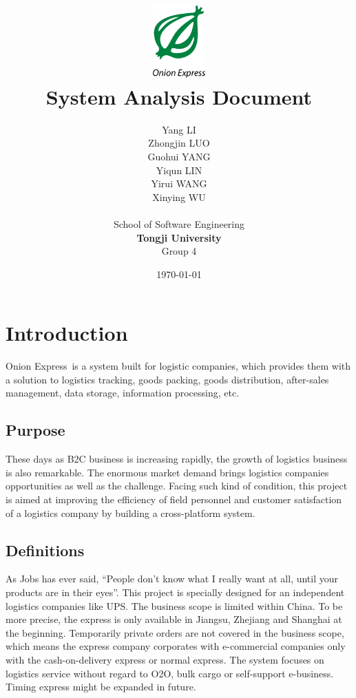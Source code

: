 \documentclass[12pt]{scrreprt}
\title{
\includegraphics[width=0.8in]{DocumentRes/OnionExpress.png} \\
\vspace*{1in}
\textbf{System Analysis Document}}
\author{Yang LI\\
        Zhongjin LUO\\
        Guohui YANG\\
        Yiqun LIN\\
        Yirui WANG\\
        Xinying WU\\
		    \vspace*{0.5in} \\
		    School of Software Engineering\\
        \textbf{Tongji University}\\
        Group 4\\
}
\date{\today}
\begin{document}
\maketitle
\tableofcontents

\chapter{Introduction}
Onion Express\textregistered\ is a system built for logistic companies,
which provides them with a solution to logistics tracking, goods packing,
goods distribution, after-sales management, data storage, information
processing, etc.

\section{Purpose}
These days as B2C business is increasing rapidly, the growth of
logistics business is also remarkable. The enormous market demand
brings logistics companies opportunities as well as the challenge.
Facing such kind of condition, this project is aimed at improving the
efficiency of field personnel and customer satisfaction of a logistics
company by building a cross-platform system.

\section{Definitions}
As Jobs has ever said, “People don't know what I really want at all,
until your products are in their eyes”. This project is specially
designed for an independent logistics companies like UPS. The business
scope is limited within China. To be more precise, the express is only
available in Jiangsu, Zhejiang and Shanghai at the beginning.
Temporarily private orders are not covered in the business scope,
which means the express company corporates with e-commercial companies only
with the cash-on-delivery express or normal express. The system focuses on logistics
service without regard to O2O, bulk cargo or self-support e-business.
Timing express might be expanded in future.
\end{document}
